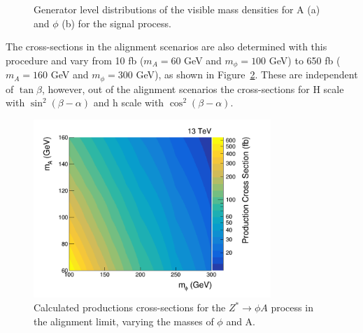 \begin{figure}[t]
\centering
\caption[Plots of the $Z\rightarrow\phi\PA$ generator level distributions of the visible masses $m^{A}_{\text{vis}}$ and $m^{\phi}_{\text{vis}}$.]{Generator level distributions of the visible mass densities for A (a) and $\phi$ (b) for the signal process.}
\label{fig:4tau_gen_dist}
\end{figure}

The cross-sections in the alignment scenarios are also determined with this procedure and vary from 10 fb ($m_{A}=60$ GeV and $m_{\phi}=100$ GeV) to 650 fb ($m_{A}=160$ GeV and $m_{\phi}=300$ GeV), as shown in Figure~\ref{fig:4tau_xs}.
These are independent of $\tan\beta$, however, out of the alignment scenarios the cross-sections for H scale with $\sin^{2}(\beta-\alpha)$ and h scale with $\cos^{2}(\beta-\alpha)$. \\

\begin{figure}[!hbtp]
\centering
    \includegraphics[width=0.8\textwidth]{Figures/cross_sections.png}
\caption[Plot of the production cross-sections for the $Z^{*} \rightarrow \phi A$ process in the alignment limit.]{Calculated productions cross-sections for the $Z^{*} \rightarrow \phi A$ process in the alignment limit, varying the masses of $\phi$ and A.}
\label{fig:4tau_xs}
\end{figure}

